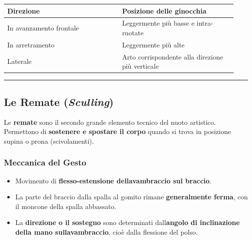 \documentclass[a4paper,11pt]{article}
\providecommand{\tightlist}{%
  \setlength{\itemsep}{0pt}\setlength{\parskip}{0pt}}
\begin{document}
\begin{longtable}[]{@{}p{0.47\linewidth}p{0.47\linewidth}@{}}
      \toprule\noalign{}
      Direzione               & Posizione delle ginocchia                        \\
      \midrule\noalign{}
      \endhead
      \bottomrule\noalign{}
      \endlastfoot
      In avanzamento frontale & Leggermente più basse e intra-ruotate            \\
      In arretramento         & Leggermente più alte                             \\
      Laterale                & Arto corrispondente alla direzione più verticale \\
\end{longtable}

\begin{center}\rule{0.5\linewidth}{0.5pt}\end{center}

\subsection{\texorpdfstring{Le Remate
            (\emph{Sculling})}{Le Remate (Sculling)}}\label{le-remate-sculling}

Le \textbf{remate} sono il secondo grande elemento tecnico del nuoto
artistico. Permettono di \textbf{sostenere e spostare il corpo} quando
si trova in posizione supina o prona (scivolamenti).

\subsubsection{Meccanica del Gesto}\label{meccanica-del-gesto}

\begin{itemize}
      \tightlist
      \item
            Movimento di \textbf{flesso-estensione
                  dell\textquotesingle avambraccio sul braccio}.
      \item
            La parte del braccio dalla spalla al gomito rimane
            \textbf{generalmente ferma}, con il moncone della spalla abbassato.
      \item
            La \textbf{direzione o il sostegno} sono determinati
            dall\textquotesingle{}\textbf{angolo di inclinazione della mano
                  sull\textquotesingle avambraccio}, cioè dalla flessione del polso.
\end{itemize}
\end{document}
